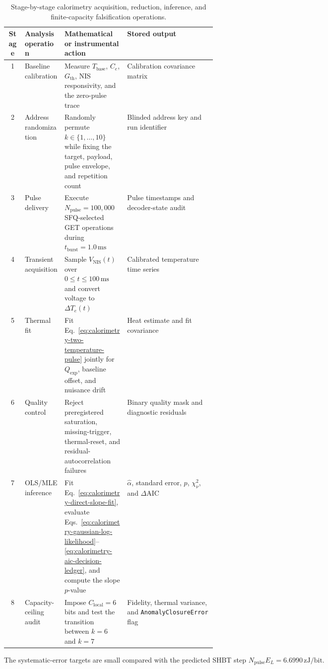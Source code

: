 \documentclass[11pt,letterpaper]{article}
\theoremstyle{plain}
\begin{document}
\begin{table}[htbp]
\centering
\scriptsize
\begin{tabularx}{\linewidth}{@{}cL{0.19\linewidth}L{0.30\linewidth}Y@{}}
\toprule
Stage & Analysis operation & Mathematical or instrumental action & Stored output \\
 & Baseline calibration & Measure \(T_{\text{base}}\), \(C_e\), \(G_{\text{th}}\), NIS responsivity, and the zero-pulse trace & Calibration covariance matrix \\
2 & Address randomization & Randomly permute \(k\in\{1,\ldots,10\}\) while fixing the target, payload, pulse envelope, and repetition count & Blinded address key and run identifier \\
3 & Pulse delivery & Execute \(N_{\text{pulse}}=100{,}000\) SFQ-selected GET operations during \(t_{\text{burst}}=1.0\,\mathrm{ms}\) & Pulse timestamps and decoder-state audit \\
4 & Transient acquisition & Sample \(V_{\text{NIS}}(t)\) over \(0\le t\le100\,\mathrm{ms}\) and convert voltage to \(\Delta T_e(t)\) & Calibrated temperature time series \\
5 & Thermal fit & Fit Eq.~\eqref{eq:calorimetry-two-temperature-pulse} jointly for \(Q_{\text{exp}}\), baseline offset, and nuisance drift & Heat estimate and fit covariance \\
6 & Quality control & Reject preregistered saturation, missing-trigger, thermal-reset, and residual-autocorrelation failures & Binary quality mask and diagnostic residuals \\
7 & OLS/MLE inference & Fit Eq.~\eqref{eq:calorimetry-direct-slope-fit}, evaluate Eqs.~\eqref{eq:calorimetry-gaussian-log-likelihood}--\eqref{eq:calorimetry-aic-decision-ledger}, and compute the slope \(p\)-value & \(\widehat\alpha\), standard error, \(p\), \(\chi_\nu^2\), and \(\Delta\mathrm{AIC}\) \\
8 & Capacity-ceiling audit & Impose \(C_{\text{local}}=6\) bits and test the transition between \(k=6\) and \(k=7\) & Fidelity, thermal variance, and \texttt{AnomalyClosureError} flag \\
\bottomrule
\end{tabularx}
\caption{Stage-by-stage calorimetry acquisition, reduction, inference, and
finite-capacity falsification operations.}
\label{tab:calorimetry-analysis-operations}
\end{table}

The systematic-error targets are small compared with the predicted SHBT step
\(N_{\text{pulse}}E_L=6.6990\,\mathrm{zJ/bit}\).
\end{document}
